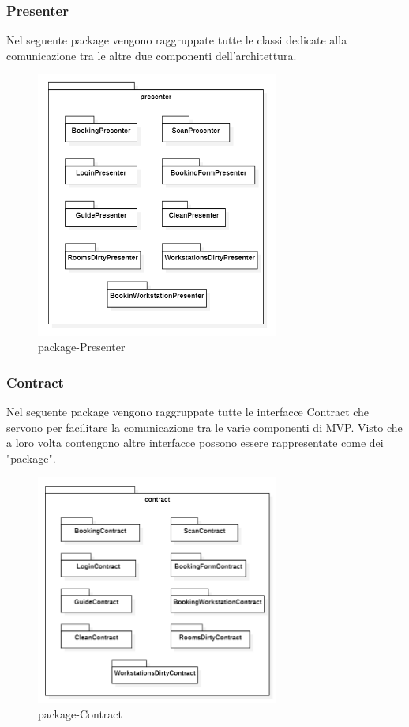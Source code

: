 \subsubsection{Presenter}
Nel seguente package vengono raggruppate tutte le classi dedicate alla comunicazione tra le altre due componenti dell'architettura.
\begin{figure}[H]
	\centering
	\includegraphics[width=8cm]{res/images/apputenti-packagePresenter.png}
	\caption{package-Presenter}
	\label{fig:package-Presenter}
\end{figure}

\subsubsection{Contract}
Nel seguente package vengono raggruppate tutte le interfacce Contract che servono per facilitare la comunicazione tra le varie componenti di MVP. Visto che a loro volta contengono altre interfacce possono essere rappresentate come dei "package".
\begin{figure}[H]
	\centering
	\includegraphics[width=8cm]{res/images/apputenti-packageContract.png}
	\caption{package-Contract}
	\label{fig:package-Contract}
\end{figure}

